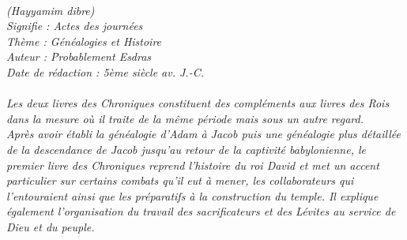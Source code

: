 \BFont
\noindent\hrulefill
{\footnotesize
\textit{
\bigskip
{\centering{}
\\(Hayyamim dibre)
\\Signifie : Actes des journées
\\Thème : Généalogies et Histoire
\\Auteur : Probablement Esdras
\\Date de rédaction : 5ème siècle av. J.-C.\\}
}
\textit{
\\Les deux livres des Chroniques constituent des compléments aux livres des Rois dans la mesure où il traite de la même période mais sous un autre regard.
\\Après avoir établi la généalogie d’Adam à Jacob puis une généalogie plus détaillée de la descendance de Jacob jusqu’au retour de la captivité babylonienne, le premier livre des Chroniques reprend l’histoire du roi David et met un accent particulier sur certains combats qu’il eut à mener, les collaborateurs qui l’entouraient ainsi que les préparatifs à la construction du temple. Il explique également l’organisation du travail des sacrificateurs et des Lévites au service de Dieu et du peuple.\bigskip
}
}
\par\nobreak\noindent\hrulefill
